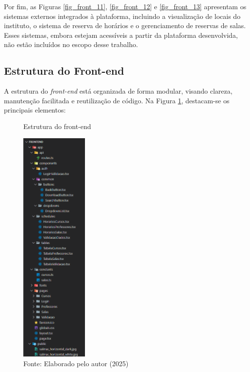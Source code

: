 Por fim, as Figuras \ref{fig_front_11}, \ref{fig_front_12} e \ref{fig_front_13} apresentam os sistemas externos integrados à plataforma, incluindo a visualização de locais do instituto, o sistema de reserva de horários e o gerenciamento de reservas de salas. Esses sistemas, embora estejam acessíveis a partir da plataforma desenvolvida, não estão incluídos no escopo desse trabalho.

\subsection{Estrutura do Front-end}

A estrutura do \textit{front-end} está organizada de forma modular, visando clareza, manutenção facilitada e reutilização de código. Na Figura \ref{fig_front_14}, destacam-se os principais elementos:

\begin{figure}[htb]
    \centering
    \caption{Estrutura do front-end}
    \includegraphics[width=0.3\textwidth]{Figuras/front-14.png}
    \caption*{Fonte: Elaborado pelo autor (2025)}
    \label{fig_front_14}
\end{figure}

